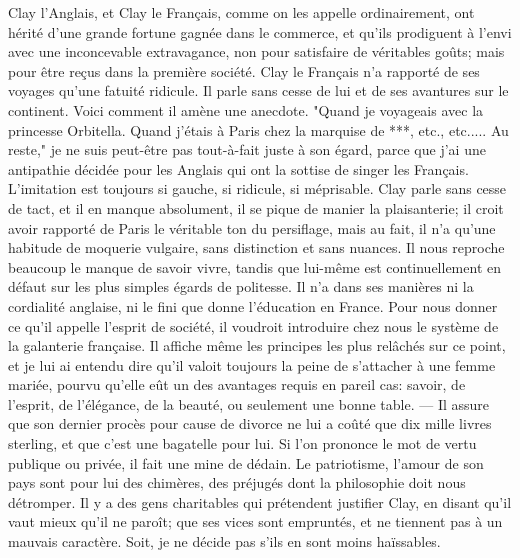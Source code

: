 Clay l'Anglais, et Clay le Français, comme on les appelle ordinairement, ont hérité d'une grande fortune gagnée dans le commerce, et qu'ils prodiguent à l'envi avec une inconcevable extravagance, non pour satisfaire de véritables goûts; mais pour être reçus dans la première société. Clay le Français n'a rapporté de ses voyages qu'une fatuité ridicule. Il parle sans cesse de lui et de ses avantures sur le continent. Voici comment il amène une anecdote. "Quand je voyageais avec la princesse Orbitella. Quand j'étais à Paris chez la marquise de ***, etc., etc..... Au reste," je ne suis peut-être\setcounter{page}{122} pas tout-à-fait juste à son égard, parce que j'ai une antipathie décidée pour les Anglais qui ont la sottise de singer les Français. L'imitation est toujours si gauche, si ridicule, si méprisable. Clay parle sans cesse de tact, et il en manque absolument, il se pique de manier la plaisanterie; il croit avoir rapporté de Paris le véritable ton du persiflage, mais au fait, il n'a qu'une habitude de moquerie vulgaire, sans distinction et sans nuances. Il nous reproche beaucoup le manque de savoir vivre, tandis que lui-même est continuellement en défaut sur les plus simples égards de politesse. Il n'a dans ses manières ni la cordialité anglaise, ni le fini que donne l'éducation en France. Pour nous donner ce qu'il appelle l'esprit de société, il voudroit introduire chez nous le système de la galanterie française. Il affiche même les principes les plus relâchés sur ce point, et je lui ai entendu dire qu'il valoit toujours la peine de s'attacher à une femme mariée, pourvu qu'elle eût un des avantages requis en pareil cas: savoir, de l'esprit, de l'élégance, de la beauté, ou seulement une bonne table. — Il assure que son dernier procès pour cause de divorce ne lui a coûté que dix mille livres sterling, et que\setcounter{page}{123} c'est une bagatelle pour lui. Si l'on prononce le mot de vertu publique ou privée, il fait une mine de dédain. Le patriotisme, l'amour de son pays sont pour lui des chimères, des préjugés dont la philosophie doit nous détromper.
Il y a des gens charitables qui prétendent justifier Clay, en disant qu'il vaut mieux qu'il ne paroît; que ses vices sont empruntés, et ne tiennent pas à un mauvais caractère. Soit, je ne décide pas s'ils en sont moins haïssables.
